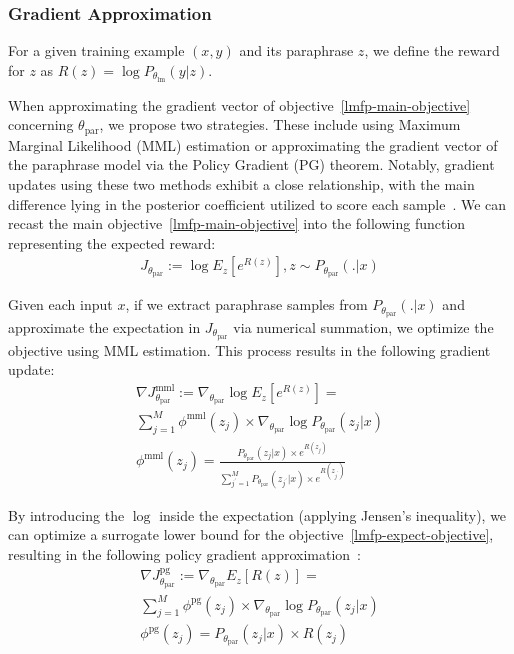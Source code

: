 \documentclass[11pt]{article}
\begin{document}
\subsubsection{Gradient Approximation}
For a given training example $(x, y)$ and its paraphrase $z$, we define the reward for $z$ as $R(z) = \log P_{\theta_{\text{lm}}} (y | z)$.

When approximating the gradient vector of objective~\ref{lmfp-main-objective} concerning $\theta_{\text{par}}$, we propose two strategies. These include using Maximum Marginal Likelihood (MML) estimation or approximating the gradient vector of the paraphrase model via the Policy Gradient (PG) theorem. Notably, gradient updates using these two methods exhibit a close relationship, with the main difference lying in the posterior coefficient utilized to score each sample~\cite{guu-etal-2017-language}. We can recast the main objective~\ref{lmfp-main-objective} into the following function representing the expected reward:
\begin{multline}
J_{\theta_{\text{par}}}
:= \log E_{z} [e^{R(z)}],
z \sim P_{\theta_{\text{par}}}(.|x)
\label{lmfp-expect-objective}
\end{multline}

Given each input $x$, if we extract paraphrase samples from $P_{\theta_{\text{par}}}(.|x)$ and approximate the expectation in $J_{\theta_{\text{par}}}$ via numerical summation, we optimize the objective using MML estimation. This process results in the following gradient update:
\begin{multline}
\nabla J^{\text{mml}}_{\theta_{\text{par}}} := \nabla_{\theta_{\text{par}}} \log E_{z} [e^{R(z)}] = \\
\sum^{M}_{j=1} \phi^{\text{mml}}(z_{j}) \times \nabla_{\theta_{\text{par}}} \log P_{\theta_{\text{par}}}(z_{j}|x) \\
\phi^{\text{mml}}(z_{j}) = \frac{P_{\theta_{\text{par}}}(z_{j}|x) \times e^{R(z_{j})}}{\sum^{M}_{j^{'}=1} P_{\theta_{\text{par}}}(z_{j^{'}}|x) \times e^{R(z_{j^{'}})}}
\label{mml-objective}
\end{multline}

By introducing the $\log$ inside the expectation (applying Jensen's inequality), we can optimize a surrogate lower bound for the objective~\ref{lmfp-expect-objective}, resulting in the following policy gradient approximation~\cite{10.5555/3009657.3009806}:
\begin{multline}
\nabla J^{\text{pg}}_{\theta_{\text{par}}} := \nabla_{\theta_{\text{par}}} E_{z} [R(z)] = \\
\sum^{M}_{j=1} \phi^{\text{pg}}(z_{j}) \times \nabla_{\theta_{\text{par}}} \log P_{\theta_{\text{par}}}(z_{j}|x) \\
\phi^{\text{pg}}(z_{j}) = P_{\theta_{\text{par}}}(z_{j}|x) \times R(z_{j})
\label{pg-objective}
\end{multline}
\end{document}
